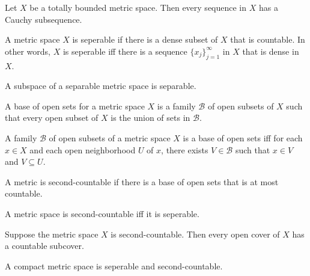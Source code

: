 \documentclass[nobib,notoc]{tufte-handout}
\begin{document}
\begin{thm}
	Let \(X\) be a totally bounded metric space. Then every sequence in \(X\) has a Cauchy subsequence.
\end{thm}
\begin{defi}[Seperability]
	A metric space \(X\) is seperable if there is a dense subset of \(X\) that is countable. In other words, \(X\) is seperable iff there is a sequence \(\{x_j\}_{j=1}^{\infty}\) in \(X\) that is dense in \(X\).
\end{defi}
\begin{thm}
	A subspace of a separable metric space is separable.
\end{thm}
\begin{defi}[Base]
	A base of open sets for a metric space \(X\) is a family \(\mathscr{B}\) of open subsets of \(X\) such that every open subset of \(X\) is the union of sets in \(\mathscr{B}\).
\end{defi}
\begin{lem}
	A family \(\mathscr{B}\) of open subsets of a metric space \(X\) is a base of open sets iff for each \(x\in X\) and each open neighborhood \(U\) of \(x\), there exists \(V\in\mathscr{B}\) such that \(x\in V\) and \(V\subseteq U\).
\end{lem}
\begin{defi}
	A metric is second-countable if there is a base of open sets that is at most countable.
\end{defi}
\begin{thm}
	A metric space is second-countable iff it is seperable.
\end{thm}
\begin{thm}
	Suppose the metric space \(X\) is second-countable. Then every open cover of \(X\) has a countable subcover.
\end{thm}
\begin{thm}
	A compact metric space is seperable and second-countable.
\end{thm}
\end{document}
